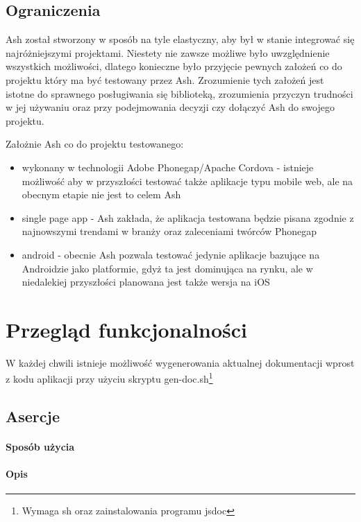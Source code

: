 \documentclass[brudnopis]{xmgr}
\begin{document}
\section{Ograniczenia}

Ash został stworzony w sposób na tyle elastyczny, aby był w stanie integrować się najróżniejszymi projektami. Niestety nie zawsze możliwe było uwzględnienie wszystkich możliwości, dlatego konieczne było przyjęcie pewnych założeń co do projektu który ma być testowany przez Ash. Zrozumienie tych założeń jest istotne do sprawnego posługiwania się biblioteką, zrozumienia przyczyn trudności w jej używaniu oraz przy podejmowania decyzji czy dołączyć Ash do swojego projektu.

Założnie Ash co do projektu testowanego:

\begin{itemize}
  \item wykonany w technologii Adobe Phonegap/Apache Cordova - istnieje możliwość aby w przyszłości testować także aplikacje typu mobile web, ale na obecnym etapie nie jest to celem Ash
  \item single page app - Ash zakłada, że aplikacja testowana będzie pisana zgodnie z najnowszymi trendami w branży oraz zaleceniami twórców Phonegap
  \item android - obecnie Ash pozwala testować jedynie aplikacje bazujące na Androidzie jako platformie, gdyż ta jest dominująca na rynku, ale w niedalekiej przyszłości planowana jest także wersja na iOS
\end{itemize}

\chapter{Przegląd funkcjonalności}

W każdej chwili istnieje możliwość wygenerowania aktualnej dokumentacji wprost z kodu aplikacji przy użyciu skryptu gen-doc.sh\footnote{Wymaga sh oraz zainstalowania programu jsdoc}

\section{Asercje}

\subsubsection{Sposób użycia}

\subsubsection{Opis}
\end{document}
